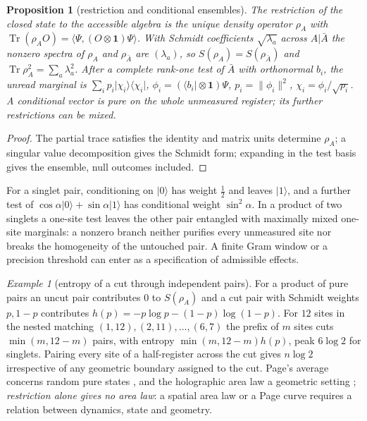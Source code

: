\documentclass[aps,pra,onecolumn,superscriptaddress,nofootinbib,10pt]{revtex4-2}
\newtheorem{proposition}[theorem]{Proposition}
\theoremstyle{definition}
\theoremstyle{remark}
\newtheorem{example}[theorem]{Example}
\newcommand{\tr}{\operatorname{Tr}}
\newcommand{\ip}[2]{\langle #1,#2\rangle}
\begin{document}
\begin{proposition}[restriction and conditional ensembles]\label{prop:curestrict}
The restriction of the closed state to the accessible algebra is the unique density operator $\rho_A$ with
$\tr(\rho_AO)=\ip{\Psi}{(O\otimes\mathbf1)\Psi}$.  With Schmidt coefficients $\sqrt{\lambda_a}$ across $A\vert\bar A$ the nonzero spectra of $\rho_A$ and
$\rho_{\bar A}$ are $(\lambda_a)$, so $S(\rho_A)=S(\rho_{\bar A})$ and $\tr\rho_A^2=\sum_a\lambda_a^2$.  After a complete rank-one test of $\bar A$ with
orthonormal $b_i$, the unread marginal is $\sum_ip_i\lvert\chi_i\rangle\langle\chi_i\rvert$, $\phi_i=(\langle b_i\rvert\otimes\mathbf1)\Psi$, $p_i=\lVert\phi_i\rVert^2$, $\chi_i=\phi_i/\sqrt{p_i}$.  A
conditional vector is pure on the whole unmeasured register; its further restrictions can be mixed.
\end{proposition}
\begin{proof}
The partial trace satisfies the identity and matrix units determine $\rho_A$; a singular value decomposition
gives the Schmidt form; expanding in the test basis gives the ensemble, null outcomes included.
\end{proof}
\noindent For a singlet pair, conditioning on $\lvert0\rangle$ has weight $\tfrac12$ and leaves $\lvert1\rangle$, and a further test of
$\cos\alpha\lvert0\rangle+\sin\alpha\lvert1\rangle$ has conditional weight $\sin^2\alpha$.  In a product of two singlets a one-site test leaves the other pair
entangled with maximally mixed one-site marginals: a nonzero branch neither purifies every unmeasured
site nor breaks the homogeneity of the untouched pair.  A finite Gram window or a precision threshold
can enter as a specification of admissible effects.

\begin{example}[entropy of a cut through independent pairs]\label{ex:cupage}
For a product of pure pairs an uncut pair contributes $0$ to $S(\rho_A)$ and a cut pair with Schmidt weights $p,1-p$
contributes $h(p)=-p\log p-(1-p)\log(1-p)$.  For $12$ sites in the nested matching $(1,12),(2,11),\dots,(6,7)$ the prefix
of $m$ sites cuts $\min(m,12-m)$ pairs, with entropy $\min(m,12-m)h(p)$, peak $6\log2$ for singlets.  Pairing every site
of a half-register across the cut gives $n\log2$ irrespective of any geometric boundary assigned to the cut.
Page's average concerns random pure states \cite{n1-page}, and the holographic area law a geometric
setting \cite{n1-rt}; \emph{restriction alone gives no area law}: a spatial area law or a Page curve
requires a relation between dynamics, state and geometry.
\end{example}
\end{document}
